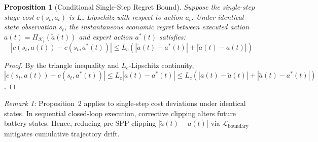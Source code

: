 \documentclass[journal]{IEEEtran}
\newtheorem{proposition}{Proposition}
\theoremstyle{remark}
\begin{document}
\begin{proposition}[Conditional Single-Step Regret Bound]
Suppose the single-step stage cost $c(s_t, a_t)$ is $L_c$-Lipschitz with respect to action $a_t$. Under identical state observation $s_t$, the instantaneous economic regret between executed action $a(t) = \Pi_{\mathcal{K}_t}(\tilde{a}(t))$ and expert action $a^*(t)$ satisfies:
\begin{equation}
|c(s_t, a(t)) - c(s_t, a^*(t))| \le L_c \left( |\tilde{a}(t) - a^*(t)| + |\tilde{a}(t) - a(t)| \right)
\label{eq:prop2_bound}
\end{equation}
\end{proposition}
\begin{proof}
By the triangle inequality and $L_c$-Lipschitz continuity, $|c(s_t, a(t)) - c(s_t, a^*(t))| \le L_c |a(t) - a^*(t)| \le L_c (|a(t) - \tilde{a}(t)| + |\tilde{a}(t) - a^*(t)|)$.
\end{proof}
\textit{Remark 1:} Proposition~2 applies to single-step cost deviations under identical states. In sequential closed-loop execution, corrective clipping alters future battery states. Hence, reducing pre-SPP clipping $|\tilde{a}(t) - a(t)|$ via $\mathcal{L}_{\mathrm{boundary}}$ mitigates cumulative trajectory drift.
\end{document}
